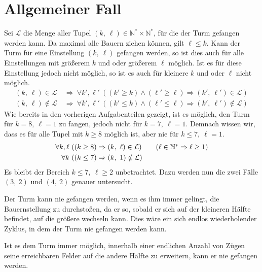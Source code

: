 \documentclass[a4paper, 11pt]{scrartcl}
\begin{document}
\section*{Allgemeiner Fall}
Sei $\mathcal{L}$ die Menge aller Tupel $(k,\ \ell) \in \mathbb{N^*}\times \mathbb{N^*}$, für die der Turm gefangen werden kann. Da maximal alle Bauern ziehen können, gilt $\ell \leq k$. Kann der Turm für eine Einstellung $(k,\ \ell)$ gefangen werden, so ist dies auch für alle Einstellungen mit größerem $k$ und oder größerem $\ell$ möglich. Ist es für diese Einstellung jedoch nicht möglich, so ist es auch für kleinere $k$ und oder $\ell$ nicht möglich.
\begin{align*}
	(k,\ \ell) \in \mathcal{L} \:&\Rightarrow\: \forall k',\ell'\ \left( (k' \geq k) \wedge (\ell' \geq \ell) \Rightarrow (k',\ \ell') \in \mathcal{L} \right) \\
	(k,\ \ell) \notin \mathcal{L} \:&\Rightarrow\: \forall k',\ell'\ \left( (k' \leq k) \wedge (\ell' \leq \ell) \Rightarrow (k',\ \ell') \notin \mathcal{L} \right)
\end{align*}
Wie bereits in den vorherigen Aufgabenteilen gezeigt, ist es möglich, den Turm für $k=8,\ \ell=1$ zu fangen, jedoch nicht für $k=7,\ \ell=1$. Demnach wissen wir, dass es für alle Tupel mit $k \geq 8$ möglich ist, aber nie für $k \leq 7,\ \ell = 1$.
\begin{align*}
	\forall k,\ell\ ( (k \geq 8) &\Rightarrow (k,\ \ell) \in \mathcal{L} ) \tag{$\ell \in \mathbb{N}^* \Rightarrow \ell \geq 1$} \\
	\forall k\ ( (k \leq 7) &\Rightarrow (k,\ 1) \notin \mathcal{L} )
\end{align*}
Es bleibt der Bereich $k \leq 7,\ \ell \geq 2$ unbetrachtet. Dazu werden nun die zwei Fälle $(3,\ 2)$ und $(4,\ 2)$ genauer untersucht.

Der Turm kann nie gefangen werden, wenn es ihm immer gelingt, die Bauernstellung zu durchstoßen, da er so, sobald er sich auf der kleineren Hälfte befindet, auf die größere wechseln kann. Dies wäre ein sich endlos wiederholender Zyklus, in dem der Turm nie gefangen werden kann.
\begin{framed}
	Ist es dem Turm immer möglich, innerhalb einer endlichen Anzahl von Zügen seine erreichbaren Felder auf die andere Hälfte zu erweitern, kann er nie gefangen werden.
\end{framed}
\end{document}
